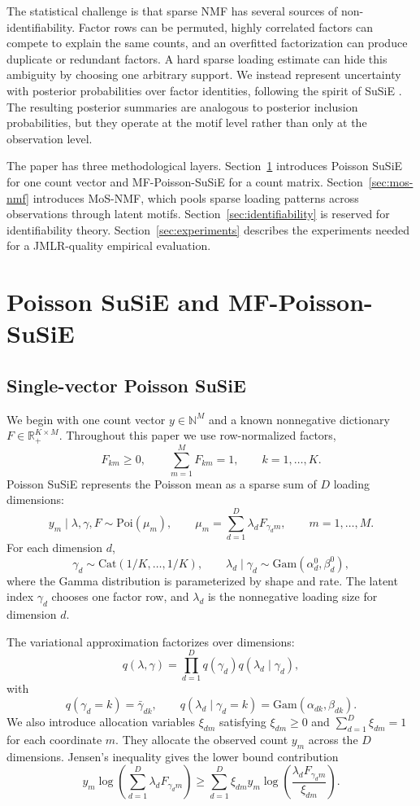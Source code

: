 \documentclass[11pt]{article}
\newcommand{\N}{\mathbb{N}}
\newcommand{\R}{\mathbb{R}}
\newcommand{\Poi}{\mathrm{Poi}}
\newcommand{\Gam}{\mathrm{Gam}}
\newcommand{\Cat}{\mathrm{Cat}}
\theoremstyle{definition}
\begin{document}
The statistical challenge is that sparse NMF has several sources of
non-identifiability. Factor rows can be permuted, highly correlated factors can
compete to explain the same counts, and an overfitted factorization can produce
duplicate or redundant factors. A hard sparse loading estimate can hide this
ambiguity by choosing one arbitrary support. We instead represent uncertainty
with posterior probabilities over factor identities, following the spirit of
SuSiE \citep{Wang2020-cr}. The resulting posterior summaries are analogous to
posterior inclusion probabilities, but they operate at the motif level rather
than only at the observation level.

The paper has three methodological layers. Section~\ref{sec:pois-susie}
introduces Poisson SuSiE for one count vector and MF-Poisson-SuSiE for a count
matrix. Section~\ref{sec:mos-nmf} introduces MoS-NMF, which pools sparse loading
patterns across observations through latent motifs. Section~\ref{sec:identifiability}
is reserved for identifiability theory. Section~\ref{sec:experiments} describes
the experiments needed for a JMLR-quality empirical evaluation.

\section{Poisson SuSiE and MF-Poisson-SuSiE}
\label{sec:pois-susie}

\subsection{Single-vector Poisson SuSiE}

We begin with one count vector $y \in \N^M$ and a known nonnegative dictionary
$F \in \R_+^{K \times M}$. Throughout this paper we use row-normalized factors,
\[
  F_{km} \geq 0,
  \qquad
  \sum_{m=1}^M F_{km}=1,
  \qquad k=1,\ldots,K.
\]
Poisson SuSiE represents the Poisson mean as a sparse sum of $D$ loading
dimensions:
\[
  y_m \mid \lambda,\gamma,F
  \sim
  \Poi(\mu_m),
  \qquad
  \mu_m =
  \sum_{d=1}^D \lambda_d F_{\gamma_d m},
  \qquad m=1,\ldots,M.
\]
For each dimension $d$,
\[
  \gamma_d \sim \Cat(1/K,\ldots,1/K),
  \qquad
  \lambda_d \mid \gamma_d \sim \Gam(\alpha_d^0,\beta_d^0),
\]
where the Gamma distribution is parameterized by shape and rate. The latent
index $\gamma_d$ chooses one factor row, and $\lambda_d$ is the nonnegative
loading size for dimension $d$.

The variational approximation factorizes over dimensions:
\[
  q(\lambda,\gamma)
  =
  \prod_{d=1}^D q(\gamma_d)q(\lambda_d \mid \gamma_d),
\]
with
\[
  q(\gamma_d=k)=\bar{\gamma}_{dk},
  \qquad
  q(\lambda_d \mid \gamma_d=k)=\Gam(\alpha_{dk},\beta_{dk}).
\]
We also introduce allocation variables $\xi_{dm}$ satisfying
$\xi_{dm}\geq 0$ and $\sum_{d=1}^D \xi_{dm}=1$ for each coordinate $m$. They
allocate the observed count $y_m$ across the $D$ dimensions. Jensen's inequality
gives the lower bound contribution
\[
  y_m \log\left(\sum_{d=1}^D \lambda_d F_{\gamma_d m}\right)
  \geq
  \sum_{d=1}^D
  \xi_{dm}y_m
  \log\left(\frac{\lambda_d F_{\gamma_d m}}{\xi_{dm}}\right).
\]
\end{document}
